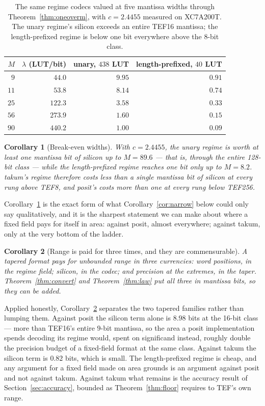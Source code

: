 \documentclass[11pt]{article}
\newtheorem{corollary}{Corollary}
\theoremstyle{definition}
\begin{document}
\begin{table}[t]\centering
\caption{The same regime codecs valued at five mantissa widths through
Theorem~\ref{thm:oneoverm}, with $c = 2.4455$ measured on XC7A200T. The unary
regime's silicon exceeds an entire TEF16 mantissa; the length-prefixed regime is
below one bit everywhere above the 8-bit class.}
\label{tab:oneoverm}
\begin{tabular}{rrrr}
\toprule
$M$ & $\lambda$ (LUT/bit) & unary, $438$ LUT & length-prefixed, $40$ LUT \\
\midrule
$9$  & $44.0$  & $\mathbf{9.95}$ & $0.91$ \\
$11$ & $53.8$  & $8.14$ & $0.74$ \\
$25$ & $122.3$ & $3.58$ & $0.33$ \\
$56$ & $273.9$ & $1.60$ & $0.15$ \\
$90$ & $440.2$ & $1.00$ & $0.09$ \\
\bottomrule
\end{tabular}
\end{table}

\begin{corollary}[Break-even widths]
\label{cor:breakeven}
With $c = 2.4455$, the unary regime is worth at least one mantissa bit of silicon
up to $M = 89.6$ --- that is, through the entire 128-bit class --- while the
length-prefixed regime reaches one bit only up to $M = 8.2$. takum's regime
therefore costs less than a single mantissa bit of silicon at every rung above
TEF8, and posit's costs more than one at every rung below TEF256.
\end{corollary}

Corollary~\ref{cor:breakeven} is the exact form of what
Corollary~\ref{cor:narrow} below could only say qualitatively, and it is the sharpest
statement we can make about where a fixed field pays for itself in area: against
posit, almost everywhere; against takum, only at the very bottom of the ladder.

\begin{corollary}[Range is paid for three times, and they are commensurable]
\label{cor:three}
A tapered format pays for unbounded range in three currencies: word positions,
in the regime field; silicon, in the codec; and precision at the extremes, in the
taper. Theorem~\ref{thm:convert} and Theorem~\ref{thm:law} put all three in
mantissa bits, so they can be added.
\end{corollary}

Applied honestly, Corollary~\ref{cor:three} separates the two tapered families
rather than lumping them. Against posit the silicon term alone is $8.98$ bits at
the 16-bit class --- more than TEF16's entire $9$-bit mantissa, so the area a
posit implementation spends decoding its regime would, spent on significand
instead, roughly double the precision budget of a fixed-field format at the same
class. Against takum the silicon term is $0.82$ bits, which is small. The
length-prefixed regime is cheap, and any argument for a fixed field made on area
grounds is an argument against posit and not against takum. Against takum what
remains is the accuracy result of Section~\ref{sec:accuracy}, bounded as
Theorem~\ref{thm:floor} requires to TEF's own range.
\end{document}
